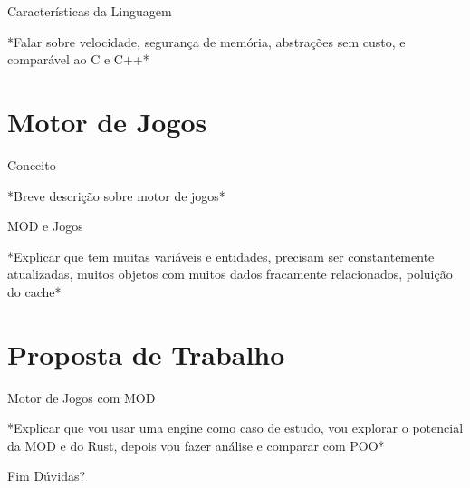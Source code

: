 \documentclass{beamer}
\begin{document}
\begin{frame}[t]{Características da Linguagem}

    *Falar sobre velocidade, segurança de memória, abstrações sem custo, e comparável 
    ao C e C++*
    
\end{frame}

\section{Motor de Jogos}

\begin{frame}[t]{Conceito}

    *Breve descrição sobre motor de jogos*
    
\end{frame}

\begin{frame}[t]{MOD e Jogos}

    *Explicar que tem muitas variáveis e entidades, precisam ser constantemente 
    atualizadas, muitos objetos com muitos dados fracamente relacionados, 
    poluição do cache*
    
\end{frame}

\section{Proposta de Trabalho}

\begin{frame}[t]{Motor de Jogos com MOD}

    *Explicar que vou usar uma engine como caso de estudo, vou explorar o potencial da 
    MOD e do Rust, depois vou fazer análise e comparar com POO*
    
\end{frame}

\begin{frame}{Fim}
    \centering
    \LARGE{Dúvidas?}
\end{frame}
\end{document}
